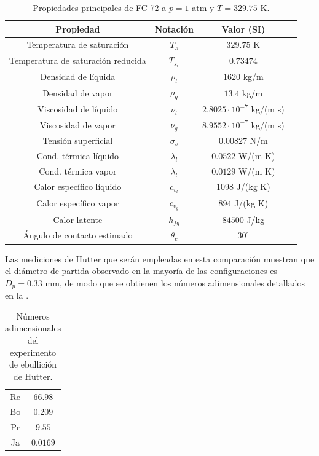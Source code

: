 \begin{table}[ht]
	\centering
    \begin{tabular}{c c c c}
	    \toprule
        \bf Propiedad & \bf Notaci\'on & \bf Valor (SI) \\
        \midrule
		Temperatura de saturaci\'on & $T_s$ & $329.75$ K \\
		Temperatura de saturaci\'on reducida & $T_{s_r}$ & $0.73474$ \\
		Densidad de l\'iquida & $\rho_l$ & $1620$ kg/m\sps{3} \\
		Densidad de vapor & $\rho_g$ & $13.4$ kg/m\sps{3} \\		
		Viscosidad de l\'iquido & $\nu_l$ & $2.8025 \cdot 10^{-7}$ kg/(m s) \\		
		Viscosidad de vapor & $\nu_g$ & $8.9552 \cdot 10^{-7}$ kg/(m s) \\
		Tensi\'on superficial & $\sigma_s$ & $0.00827$ N/m \\
		Cond. t\'ermica l\'iquido & $\lambda_l$ & $0.0522$ W/(m K) \\
		Cond. t\'ermica vapor & $\lambda_l$ & $0.0129$ W/(m K) \\
		Calor espec\'ifico l\'iquido & $c_{v_l}$ & $1098$ J/(kg K) \\
		Calor espec\'ifico vapor & $c_{v_g}$ & $894$ J/(kg K) \\
		Calor latente & $h_{fg}$ & $84500$ J/kg \\
		\'Angulo de contacto estimado & $\theta_c$ & $30^{\circ}$ \\
        \bottomrule
	\end{tabular}
	\caption{Propiedades principales de FC-72 a $p=1$ atm y $T=329.75$ K.}
	\label{tab:fc72_prop}
\end{table} 
\FloatBarrier

Las mediciones de Hutter que ser\'an empleadas en esta comparaci\'on muestran que el di\'ametro de partida observado en la mayor\'ia de las configuraciones es $D_p=0.33$ mm, de modo que se obtienen los n\'umeros adimensionales detallados en la .
\begin{table}[ht]
	\centering
    \begin{tabular}{c c}
	    \toprule
		Re & $66.98$  \\
		Bo & $0.209$  \\
		Pr & $9.55$   \\
		Ja & $0.0169$ \\
        \bottomrule
	\end{tabular}
	\caption{N\'umeros adimensionales del experimento de ebullici\'on de Hutter.}
	\label{tab:exp_adim}
\end{table} 


